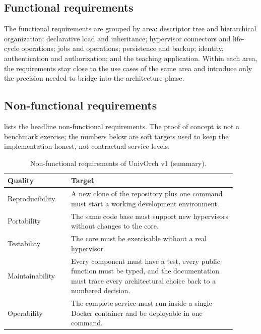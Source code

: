 \subsection{Functional requirements}

The functional requirements are grouped by area: descriptor tree
and hierarchical organization; declarative load and inheritance;
hypervisor connectors and life-cycle operations; jobs and
operations; persistence and backup; identity, authentication and
authorization; and the teaching application. Within each area, the
requirements stay close to the use cases of the same area and
introduce only the precision needed to bridge into the architecture
phase.

\subsection{Non-functional requirements}

 lists the headline non-functional requirements. The
proof of concept is not a benchmark exercise; the numbers below are
soft targets used to keep the implementation honest, not contractual
service levels.

\begin{table}[ht]
  \centering
  \small
  \begin{tabular}{p{0.25\linewidth} p{0.65\linewidth}}
    \toprule
    \textbf{Quality} & \textbf{Target} \\
    \midrule
    Reproducibility &
    A new clone of the repository plus one command must start a
    working development environment. \\
    Portability &
    The same code base must support new hypervisors without changes
    to the core. \\
    Testability &
    The core must be exercisable without a real hypervisor. \\
    Maintainability &
    Every component must have a test, every public function must be
    typed, and the documentation must trace every architectural
    choice back to a numbered decision. \\
    Operability &
    The complete service must run inside a single Docker container
    and be deployable in one command. \\
    \bottomrule
  \end{tabular}
  \caption{Non-functional requirements of UnivOrch v1 (summary).}
  \label{tab:nfr}
\end{table}

